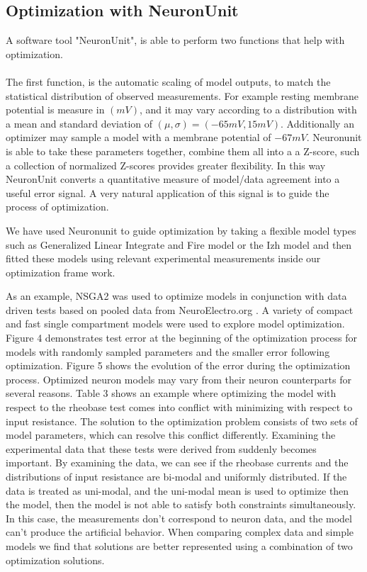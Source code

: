 \subsection{Optimization with NeuronUnit}
A software tool "NeuronUnit", is able to perform two functions that help with optimization.\\
\\
The first function, is the automatic scaling of model outputs, to match the statistical distribution of observed measurements.%
%
For example resting membrane potential is measure in $(mV)$, and it may vary according to a distribution with a mean and standard deviation of $(\mu,\sigma)=(-65mV,15mV)$. Additionally an optimizer may sample a model with a membrane potential of $-67mV$. Neuronunit is able to take these parameters together, combine them all into a a Z-score, such a collection of normalized Z-scores provides greater flexibility. In this way NeuronUnit converts a quantitative measure of model/data agreement into a useful error signal. A very natural application of this signal is to guide the process of optimization.\newline 

We have used Neuronunit to guide optimization by taking a flexible model types such as Generalized Linear Integrate and Fire model\cite{teeter2018generalized} or the Izh model and then fitted these models using relevant experimental measurements inside our optimization frame work.

As an example, NSGA2 was used to optimize models in conjunction with data driven tests based on pooled data from NeuroElectro.org \cite{tripathy2014neuroelectro}. A variety of compact and fast single compartment models were used to explore model optimization. Figure 4 demonstrates test error at the beginning of the optimization process for models with randomly sampled parameters and the smaller error following optimization. Figure 5 shows the evolution of the error during the optimization process. \newline
\newline
Optimized neuron models may vary from their neuron counterparts for several reasons. Table 3 shows an example where optimizing the model with respect to the rheobase test comes into conflict with minimizing with respect to input resistance. The solution to the optimization problem consists of two sets of model parameters, which can resolve this conflict differently. Examining the experimental data that these tests were derived from suddenly becomes important. By examining the data, we can see if the rheobase currents and the distributions of input resistance are bi-modal and uniformly distributed. If the data is treated as uni-modal, and the uni-modal mean is used to optimize then the model, then the model is not able to satisfy both constraints simultaneously. In this case, the measurements don’t correspond to neuron data, and the model can’t produce the artificial behavior. When comparing complex data and simple models we find that solutions are better represented using a combination of two optimization solutions.\newline
\newline

